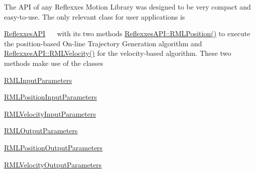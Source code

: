 The A\+PI of any Reflexxes Motion Library was designed to be very compact and easy-\/to-\/use. The only relevant class for user applications is~\newline
~\newline

\begin{DoxyItemize}
\item \mbox{\hyperlink{classReflexxesAPI}{Reflexxes\+A\+PI}}~\newline
~\newline
 with its two methods \mbox{\hyperlink{classReflexxesAPI_a30d3cdba072553a5d53aa4ce4b4a77d1}{Reflexxes\+A\+P\+I\+::\+R\+M\+L\+Position()}} to execute the position-\/based On-\/line Trajectory Generation algorithm and \mbox{\hyperlink{classReflexxesAPI_aaf2478f04265b6a6ac04b1b218a30678}{Reflexxes\+A\+P\+I\+::\+R\+M\+L\+Velocity()}} for the velocity-\/based algorithm. These two methods make use of the classes~\newline
~\newline
 
\begin{DoxyItemize}
\item \mbox{\hyperlink{classRMLInputParameters}{R\+M\+L\+Input\+Parameters}}~\newline
~\newline
 
\begin{DoxyItemize}
\item \mbox{\hyperlink{classRMLPositionInputParameters}{R\+M\+L\+Position\+Input\+Parameters}} 
\item \mbox{\hyperlink{classRMLVelocityInputParameters}{R\+M\+L\+Velocity\+Input\+Parameters}}~\newline
~\newline
 
\end{DoxyItemize}
\item \mbox{\hyperlink{classRMLOutputParameters}{R\+M\+L\+Output\+Parameters}}~\newline
~\newline
 
\begin{DoxyItemize}
\item \mbox{\hyperlink{classRMLPositionOutputParameters}{R\+M\+L\+Position\+Output\+Parameters}} 
\item \mbox{\hyperlink{classRMLVelocityOutputParameters}{R\+M\+L\+Velocity\+Output\+Parameters}}~\newline
~\newline
 

\end{DoxyItemize}
\end{DoxyItemize}
\end{DoxyItemize}

